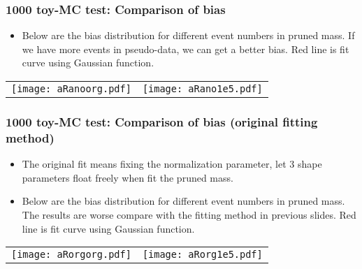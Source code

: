 \documentclass{beamer}
\begin{document}
\begin{frame}
  \frametitle{1000 toy-MC test: Comparison of bias}
  \begin{center}
    \begin{footnotesize}
      \begin{itemize}
      \item Below are the bias distribution for different event numbers in pruned mass. If we have more events in pseudo-data, we can get a better bias. Red line is fit curve using Gaussian function.
      \end{itemize}
    \end{footnotesize}
    \begin{tabular}{ll}
      \texttt{[image: aRanoorg.pdf]} &
      \texttt{[image: aRano1e5.pdf]} \\
    \end{tabular}
  \end{center}
\end{frame}

\begin{frame}
  \frametitle{1000 toy-MC test: Comparison of bias (original fitting method)}
  \begin{center}
    \begin{footnotesize}
      \begin{itemize}
      \item The original fit means fixing the normalization parameter, let 3 shape parameters float freely when fit the pruned mass.
      \item Below are the bias distribution for different event numbers in pruned mass. The results are worse compare with the fitting method in previous slides. Red line is fit curve using Gaussian function.
      \end{itemize}
    \end{footnotesize}
    \begin{tabular}{ll}
      \texttt{[image: aRorgorg.pdf]} &
      \texttt{[image: aRorg1e5.pdf]} \\
    \end{tabular}
  \end{center}
\end{frame}
\end{document}

